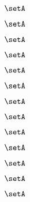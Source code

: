 \begin{forslides}
    \begin{equation}
        \label{eq:slides-processes-57}
        \setA
    \end{equation}

    \begin{equation}
        \label{eq:slides-processes-58}
        \setA
    \end{equation}

    \begin{equation}
        \label{eq:slides-processes-59}
        \setA
    \end{equation}
    
    \begin{equation}
        \label{eq:slides-processes-60}
        \setA
    \end{equation}

    \begin{equation}
        \label{eq:slides-processes-61}
        \setA
    \end{equation}

    \begin{equation}
        \label{eq:slides-processes-62}
        \setA
    \end{equation}

    \begin{equation}
        \label{eq:slides-processes-63}
        \setA
    \end{equation}

    \begin{equation}
        \label{eq:slides-processes-64}
        \setA
    \end{equation}

    \begin{equation}
        \label{eq:slides-processes-65}
        \setA
    \end{equation}

    \begin{equation}
        \label{eq:slides-processes-66}
        \setA
    \end{equation}

    \begin{equation}
        \label{eq:slides-processes-67}
        \setA
    \end{equation}

    \begin{equation}
        \label{eq:slides-processes-68}
        \setA
    \end{equation}

    \begin{equation}
        \label{eq:slides-processes-69}
        \setA
    \end{equation}
    

\end{forslides}
